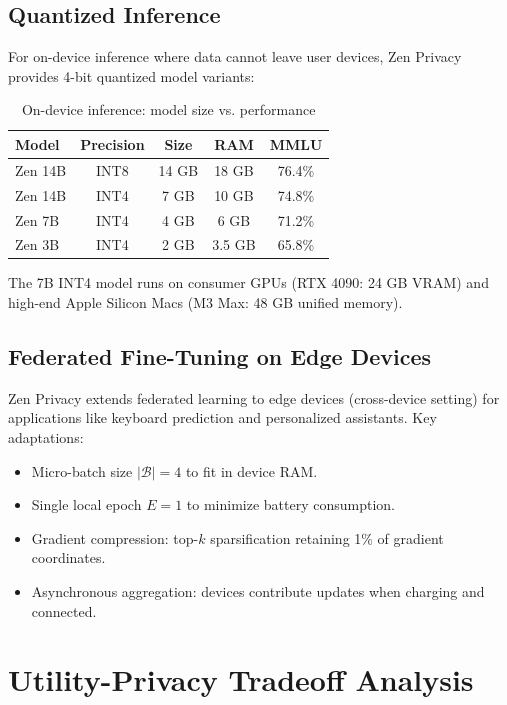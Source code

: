 \documentclass[11pt,a4paper]{article}
\begin{document}
\subsection{Quantized Inference}

For on-device inference where data cannot leave user devices, Zen Privacy provides 4-bit quantized model variants:

\begin{table}[H]
\centering
\caption{On-device inference: model size vs. performance}
\label{tab:on_device}
\begin{tabular}{lcccc}
\toprule
Model & Precision & Size & RAM & MMLU \\
\midrule
Zen 14B & INT8 & 14 GB & 18 GB & 76.4\% \\
Zen 14B & INT4 & 7 GB & 10 GB & 74.8\% \\
Zen 7B & INT4 & 4 GB & 6 GB & 71.2\% \\
Zen 3B & INT4 & 2 GB & 3.5 GB & 65.8\% \\
\bottomrule
\end{tabular}
\end{table}

The 7B INT4 model runs on consumer GPUs (RTX 4090: 24 GB VRAM) and high-end Apple Silicon Macs (M3 Max: 48 GB unified memory).

\subsection{Federated Fine-Tuning on Edge Devices}

Zen Privacy extends federated learning to edge devices (cross-device setting) for applications like keyboard prediction and personalized assistants. Key adaptations:

\begin{itemize}
  \item Micro-batch size $|\mathcal{B}| = 4$ to fit in device RAM.
  \item Single local epoch $E=1$ to minimize battery consumption.
  \item Gradient compression: top-$k$ sparsification retaining 1\% of gradient coordinates.
  \item Asynchronous aggregation: devices contribute updates when charging and connected.
\end{itemize}

\section{Utility-Privacy Tradeoff Analysis}
\end{document}
